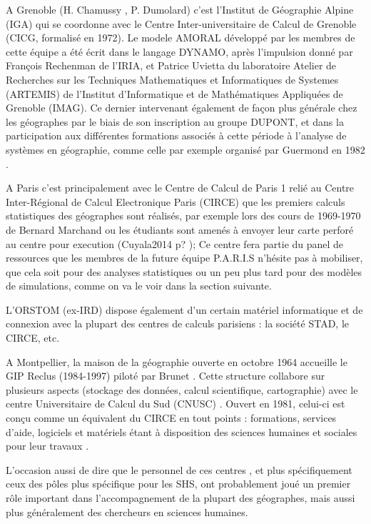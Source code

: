 A Grenoble (H. Chamussy , P. Dumolard) c’est l’Institut de Géographie Alpine (IGA) qui se coordonne avec le Centre Inter-universitaire de Calcul de Grenoble (CICG, formalisé en 1972). Le modele AMORAL développé par les membres de cette équipe a été écrit dans le langage DYNAMO, après l'impulsion  donné par François Rechenman de l'IRIA, et Patrice Uvietta du laboratoire Atelier de Recherches sur les Techniques Mathematiques et Informatiques de Systemes (ARTEMIS) de l’Institut d'Informatique et de Mathématiques Appliquées de Grenoble (IMAG). Ce dernier intervenant également de façon plus générale chez les géographes par le biais de son inscription au groupe DUPONT, et dans la participation aux différentes formations associés à cette période à l'analyse de systèmes en géographie, comme celle par exemple organisé par Guermond en 1982 \autocite{Guermond1984}.

A Paris c’est principalement avec le Centre de Calcul de Paris 1 relié au Centre Inter-Régional de Calcul Electronique Paris (CIRCE) que les premiers calculs statistiques des géographes sont réalisés, par exemple lors des cours de 1969-1970 de Bernard Marchand ou les étudiants sont amenés à envoyer leur carte perforé au centre pour execution (Cuyala2014 p? ); Ce centre fera partie du panel de ressources que les membres de la future équipe P.A.R.I.S n'hésite pas à mobiliser, que cela soit pour des analyses statistiques ou un peu plus tard pour des modèles de simulations, comme on va le voir dans la section suivante.

L’ORSTOM (ex-IRD) dispose également d’un certain matériel informatique et de connexion avec la plupart des centres de calculs parisiens : la société STAD, le CIRCE, etc. \autocite{Dejardin1992}

A Montpellier, la maison de la géographie ouverte en octobre 1964 accueille le GIP Reclus (1984-1997) piloté par Brunet \autocite{Brunet1988}. Cette structure collabore sur plusieurs aspects (stockage des données, calcul scientifique, cartographie) avec le centre Universitaire de Calcul du Sud (CNUSC) \autocite{Waniez2010}. Ouvert en 1981, celui-ci est conçu comme un équivalent du CIRCE en tout points : formations, services d’aide, logiciels et matériels étant à disposition des sciences humaines et sociales pour leur travaux  .

L’occasion aussi de dire que le personnel de ces centres , et plus spécifiquement ceux des pôles plus spécifique pour les SHS, ont probablement joué un premier rôle important dans l’accompagnement de la plupart des géographes, mais aussi plus généralement des chercheurs en sciences humaines.

